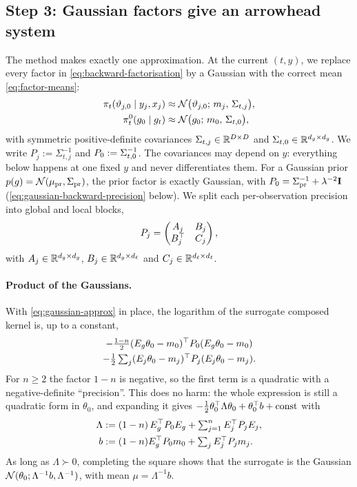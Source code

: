 \subsection{Step 3: Gaussian factors give an arrowhead system}\label{sec:arrowhead}

The method makes exactly one approximation.
At the current $(t,y)$, we replace every factor in \cref{eq:backward-factorisation} by a Gaussian with the correct mean \cref{eq:factor-means}:
\begin{equation}\label{eq:gaussian-approx}
\begin{aligned}
  \pi_t(\vartheta_{j,0}\mid y_j,x_j)&\approx\mathcal{N}\big(\vartheta_{j,0};\,m_j,\,\Sigma_{t,j}\big),\\
  \pi^0_t(g_0\mid g_t)&\approx\mathcal{N}\big(g_0;\,m_0,\,\Sigma_{t,0}\big),
\end{aligned}
\end{equation}
with symmetric positive-definite covariances $\Sigma_{t,j}\in\mathbb{R}^{D\times D}$ and $\Sigma_{t,0}\in\mathbb{R}^{d_g\times d_g}$.
We write $P_j:=\Sigma_{t,j}^{-1}$ and $P_{0}:=\Sigma_{t,0}^{-1}$.
The covariances may depend on $y$: everything below happens at one fixed $y$ and never differentiates them.
For a Gaussian prior $p(g)=\mathcal{N}(\mu_\mathrm{pr},\Sigma_\mathrm{pr})$, the prior factor is exactly Gaussian, with $P_{0}=\Sigma_\mathrm{pr}^{-1}+\lambda^{-2}\mathbf{I}$ (\cref{eq:gaussian-backward-precision} below).
We split each per-observation precision into global and local blocks,
\begin{equation}\label{eq:blocks}
  P_j=\begin{pmatrix}A_j&B_j\\B_j^\top&C_j\end{pmatrix},
\end{equation}
with $A_j\in\mathbb{R}^{d_g\times d_g}$, $B_j\in\mathbb{R}^{d_g\times d_\ell}$ and $C_j\in\mathbb{R}^{d_\ell\times d_\ell}$.

\paragraph{Product of the Gaussians.}
With \cref{eq:gaussian-approx} in place, the logarithm of the surrogate composed kernel is, up to a constant,
\begin{multline*}
  -\tfrac{1-n}{2}(E_g\theta_0-m_0)^\top P_{0}(E_g\theta_0-m_0)\\
  -\tfrac12\textstyle\sum_{j}(E_j\theta_0-m_j)^\top P_j(E_j\theta_0-m_j).
\end{multline*}
For $n\ge2$ the factor $1-n$ is negative, so the first term is a quadratic with a negative-definite ``precision''.
This does no harm: the whole expression is still a quadratic form in $\theta_0$, and expanding it gives $-\tfrac12\theta_0^\top\Lambda\theta_0+\theta_0^\top b+\text{const}$ with
\begin{align}
  \Lambda&:=(1-n)\,E_g^\top P_{0} E_g+\textstyle\sum_{j=1}^{n}E_j^\top P_jE_j,\label{eq:Lambda}\\
  b&:=(1-n)E_g^\top P_{0} m_0+\textstyle\sum_jE_j^\top P_jm_j.\notag
\end{align}
As long as $\Lambda\succ0$, completing the square shows that the surrogate is the Gaussian $\mathcal{N}(\theta_0;\Lambda^{-1}b,\Lambda^{-1})$, with mean $\mu=\Lambda^{-1}b$.

